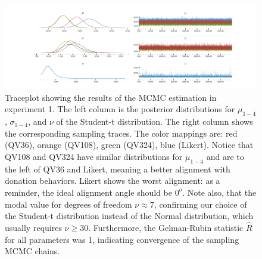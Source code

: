 \begin{figure}
  \centering
  \includegraphics[trim= 2in 0in 2in 0in, clip, width=\textwidth, keepaspectratio=true]{content/image/StudentTIndep_VA_traceplot.pdf}
  \caption{
    Traceplot showing the results of the MCMC estimation in experiment 1. The left column is the posterior distributions for $\mu_{1-4}$, $\sigma_{1-4}$, and $\nu$ of the Student-t distribution. The right column shows the corresponding sampling traces. The color mappings are: red (QV36), orange (QV108), green (QV324), blue (Likert). Notice that QV108 and QV324 have similar distributions for $\mu_{1-4}$ and are to the left of QV36 and Likert, meaning a better alignment with donation behaviors. Likert shows the worst alignment: as a reminder, the ideal alignment angle should be $0^o$. Note also, that the modal value for degrees of freedom $\nu \approx 7$, confirming our choice of the Student-t distribution instead of the Normal distribution, which usually requires $\nu \geq 30$. Furthermore, the Gelman-Rubin statistic $\hat{R}$ for all parameters was 1, indicating  convergence of the sampling MCMC chains.
  }
  \label{fig:traceplot_exp1}
\end{figure}



